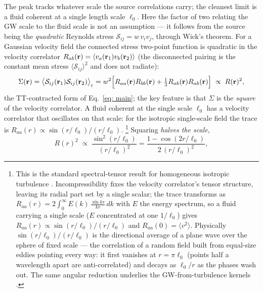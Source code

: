 \documentclass[10pt,prd,aps,nobibnotes,superscriptaddress,preprintnumbers,notitlepage]{revtex4-1}
\newcommand{\br}{{\bf r}}
\begin{document}
The peak tracks whatever scale the source correlations carry; the cleanest limit is a
fluid coherent at a single length scale $\ell_0$. Here the factor of two relating the
GW scale to the fluid scale is not an assumption --- it follows from the source being
the \emph{quadratic} Reynolds stress $\mathcal{S}_{ij}=w\,v_iv_j$, through Wick's
theorem. For a Gaussian velocity field the connected stress two-point function is
quadratic in the velocity correlator
$R_{ab}(\br)=\langle v_a(\br_1)v_b(\br_2)\rangle$ (the disconnected pairing is the
constant mean stress $\langle\mathcal{S}_{ij}\rangle^2$ and does not radiate):
\begin{equation}
  \Sigma(\br)=\bigl\langle\mathcal{S}_{ij}(\br_1)\mathcal{S}_{ij}(\br_2)\bigr\rangle_{\rm c}
  = w^2\Bigl[R_{aa}(\br)R_{bb}(\br)+\tfrac13 R_{ab}(\br)R_{ab}(\br)\Bigr]
  \;\propto\; R(\br)^2,
  \label{eq:rs2-wick}
\end{equation}
the TT-contracted form of Eq.~\eqref{eq: main}; the key feature is that $\Sigma$ is the
\emph{square} of the velocity correlator. A fluid coherent at the single scale $\ell_0$
has a velocity correlator that oscillates on that scale: for the isotropic single-scale
field the trace is $R_{aa}(r)\propto\sin(r/\ell_0)/(r/\ell_0)$.%
\nocite{Kraichnan:1959}%
\footnote{This is the standard spectral-tensor result for homogeneous isotropic
turbulence \cite{Batchelor:1953,Pope:2000,MoninYaglom:1975,Kraichnan:1959}. Incompressibility
fixes the velocity correlator's tensor structure, leaving its radial part set by a
single scalar; the trace transforms as
$R_{aa}(r)=2\int_0^\infty E(k)\,\frac{\sin kr}{kr}\,dk$ with $E$ the energy spectrum, so
a fluid carrying a single scale ($E$ concentrated at one $1/\ell_0$) gives
$R_{aa}(r)\propto\sin(r/\ell_0)/(r/\ell_0)$ and $R_{aa}(0)=\langle v^2\rangle$.
Physically $\sin(r/\ell_0)/(r/\ell_0)$ is the directional average of a plane wave over
the sphere of fixed scale --- the correlation of a random field built from equal-size
eddies pointing every way: it first vanishes at $r=\pi\ell_0$ (points half a wavelength
apart are anti-correlated) and decays as $\ell_0/r$ as the phases wash out. The same
angular reduction underlies the GW-from-turbulence kernels
\cite{Kosowsky:2001xp,Gogoberidze:2007an}.}
Squaring \emph{halves the scale},
\begin{equation}
  R(r)^2\;\propto\;\frac{\sin^2(r/\ell_0)}{(r/\ell_0)^2}
  =\frac{1-\cos(2r/\ell_0)}{2\,(r/\ell_0)^2},
  \label{eq:rs2-square}
\end{equation}
\end{document}
